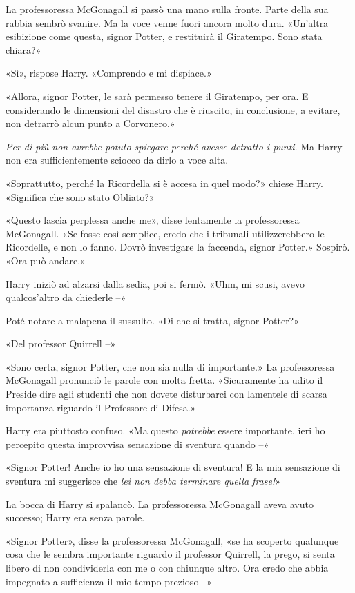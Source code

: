 La professoressa McGonagall si passò una mano sulla fronte. Parte della sua rabbia sembrò svanire. Ma la voce venne fuori ancora molto dura. «Un’altra esibizione come questa, signor Potter, e restituirà il Giratempo. Sono stata chiara?»

«Sì», rispose Harry. «Comprendo e mi dispiace.»

«Allora, signor Potter, le sarà permesso tenere il Giratempo, per ora. E considerando le dimensioni del disastro che è riuscito, in conclusione, a evitare, non detrarrò alcun punto a Corvonero.»

\textit{Per di più non avrebbe potuto spiegare perché avesse detratto i punti}. Ma Harry non era sufficientemente sciocco da dirlo a voce alta.

«Soprattutto, perché la Ricordella si è accesa in quel modo?» chiese Harry. «Significa che sono stato Obliato?»

«Questo lascia perplessa anche me», disse lentamente la professoressa McGonagall. «Se fosse così semplice, credo che i tribunali utilizzerebbero le Ricordelle, e non lo fanno. Dovrò investigare la faccenda, signor Potter.» Sospirò. «Ora può andare.»

Harry iniziò ad alzarsi dalla sedia, poi si fermò. «Uhm, mi scusi, avevo qualcos’altro da chiederle –»

Poté notare a malapena il sussulto. «Di che si tratta, signor Potter?»

«Del professor Quirrell –»

«Sono certa, signor Potter, che non sia nulla di importante.» La professoressa McGonagall pronunciò le parole con molta fretta. «Sicuramente ha udito il Preside dire agli studenti che non dovete disturbarci con lamentele di scarsa importanza riguardo il Professore di Difesa.»

Harry era piuttosto confuso. «Ma questo \textit{potrebbe} essere importante, ieri ho percepito questa improvvisa sensazione di sventura quando –»

«Signor Potter! Anche io ho una sensazione di sventura! E la mia sensazione di sventura mi suggerisce che \textit{lei non debba terminare quella frase!}»

La bocca di Harry si spalancò. La professoressa McGonagall aveva avuto successo; Harry era senza parole.

«Signor Potter», disse la professoressa McGonagall, «se ha scoperto qualunque cosa che le sembra importante riguardo il professor Quirrell, la prego, si senta libero di non condividerla con me o con chiunque altro. Ora credo che abbia impegnato a sufficienza il mio tempo prezioso –»

